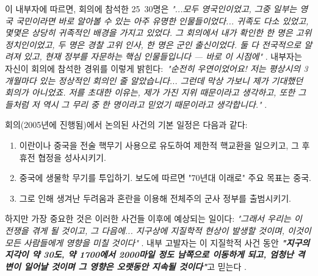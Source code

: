 \documentclass[10pt,twocolumn,letterpaper]{article}
\begin{document}
이 내부자에 따르면, 회의에 참석한 25~30명은 \textit{"...모두 영국인이었고, 그중 일부는 영국 국민이라면 바로 알아볼 수 있는 아주 유명한 인물들이었다... 귀족도 다소 있었고, 몇몇은 상당히 귀족적인 배경을 가지고 있었다. 그 회의에서 내가 확인한 한 명은 고위 정치인이었고, 두 명은 경찰 고위 인사, 한 명은 군인 출신이었다. 둘 다 전국적으로 알려져 있고, 현재 정부를 자문하는 핵심 인물들입니다 — 바로 이 시점에"} \cite{4}. 내부자는 자신이 회의에 참석한 경위를 이렇게 밝힌다:\ \textit{"순전히 우연이었어요! 저는 평상시의 3개월마다 있는 정상적인 회의인 줄 알았습니다... 그런데 막상 가보니 제가 기대했던 회의가 아니었죠. 저를 초대한 이유는, 제가 가진 지위 때문이라고 생각하고, 또한 그들처럼 저 역시 그 무리 중 한 명이라고 믿었기 때문이라고 생각합니다."} \cite{4}.

회의(2005년에 진행됨)에서 논의된 사건의 기본 일정은 다음과 같다:

\begin{flushleft}
\begin{enumerate}
    \item 이란이나 중국을 전술 핵무기 사용으로 유도하여 제한적 핵교환을 일으키고, 그 후 휴전 협정을 성사시키기.
    \item 중국에 생물학 무기를 투입하기. 보도에 따르면 "70년대 이래로" 주요 목표는 중국.
    \item 그로 인해 생겨난 두려움과 혼란을 이용해 전체주의 군사 정부를 출범시키기.
\end{enumerate}
\end{flushleft}

하지만 가장 중요한 것은 이러한 사건들 이후에 예상되는 일이다: \textit{"그래서 우리는 이 전쟁을 겪게 될 것이고, 그 다음에... 지구상에 지질학적 현상이 발생할 것이며, 이것이 모든 사람들에게 영향을 미칠 것이다"} \cite{4}. 내부 고발자는 이 지질학적 사건 동안 \textit{\textbf{"지구의 지각이 약 30도, 약 1700에서 2000마일 정도 남쪽으로 이동하게 되고, 엄청난 격변이 일어날 것이며 그 영향은 오랫동안 지속될 것이다"}}고 믿는다 \cite{4}.
\end{document}
